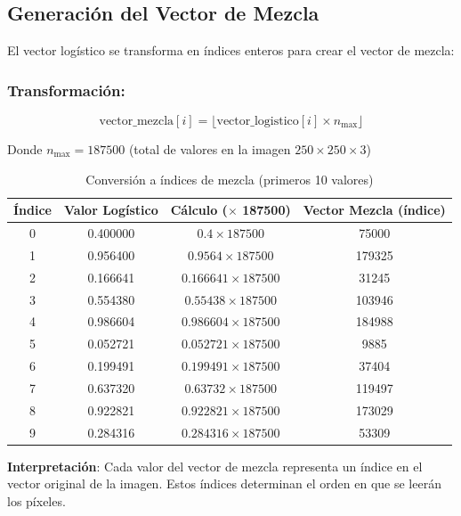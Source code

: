 \documentclass[12pt,a4paper]{article}
\begin{document}
\subsection{Generación del Vector de Mezcla}

El vector logístico se transforma en índices enteros para crear el vector de mezcla:

\subsubsection*{Transformación:}
\begin{equation}
\text{vector\_mezcla}[i] = \lfloor \text{vector\_logistico}[i] \times n_{\text{max}} \rfloor
\label{eq:mixing}
\end{equation}

Donde $n_{\text{max}} = 187500$ (total de valores en la imagen $250 \times 250 \times 3$)

\begin{table}[H]
\centering
\caption{Conversión a índices de mezcla (primeros 10 valores)}
\label{tab:mixing}
\begin{tabular}{@{}cccc@{}}
\toprule
\textbf{Índice} & \textbf{Valor Logístico} & \textbf{Cálculo ($\times$ 187500)} & \textbf{Vector Mezcla (índice)} \\ \midrule
0 & 0.400000 & $0.4 \times 187500$ & 75000 \\
1 & 0.956400 & $0.9564 \times 187500$ & 179325 \\
2 & 0.166641 & $0.166641 \times 187500$ & 31245 \\
3 & 0.554380 & $0.55438 \times 187500$ & 103946 \\
4 & 0.986604 & $0.986604 \times 187500$ & 184988 \\
5 & 0.052721 & $0.052721 \times 187500$ & 9885 \\
6 & 0.199491 & $0.199491 \times 187500$ & 37404 \\
7 & 0.637320 & $0.63732 \times 187500$ & 119497 \\
8 & 0.922821 & $0.922821 \times 187500$ & 173029 \\
9 & 0.284316 & $0.284316 \times 187500$ & 53309 \\ \bottomrule
\end{tabular}
\end{table}

\textbf{Interpretación}: Cada valor del vector de mezcla representa un índice en el vector original de la imagen. Estos índices determinan el orden en que se leerán los píxeles.
\end{document}
